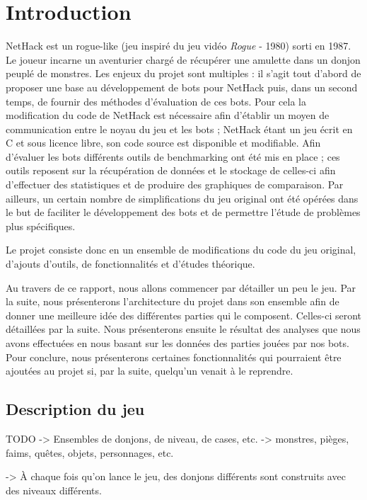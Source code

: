 \documentclass[a4paper,12pt]{article}
\begin{document}
\tableofcontents
\pagebreak

\section{Introduction}

NetHack est un rogue-like (jeu inspiré du jeu vidéo \emph{Rogue} - 1980)
sorti en 1987. Le joueur incarne un aventurier chargé de récupérer une
amulette dans un donjon peuplé de monstres.
Les enjeux du projet sont multiples : il s'agit tout d'abord de proposer une
base au développement de bots pour NetHack puis, dans un second temps, de
fournir des méthodes d'évaluation de ces bots. Pour cela la modification du code
de NetHack est nécessaire afin d'établir un moyen de communication entre le
noyau du jeu et les bots ; NetHack étant un jeu écrit en C et sous licence
libre, son code source est disponible et modifiable. Afin d'évaluer les bots
différents outils de benchmarking ont été mis en place ; ces outils reposent
sur la récupération de données et le stockage de celles-ci afin d'effectuer
des statistiques et de produire des graphiques de comparaison.
Par ailleurs, un certain nombre de simplifications du jeu original ont été
opérées dans le but de faciliter le développement des bots et de permettre
l'étude de problèmes plus spécifiques.  

Le projet consiste donc en un ensemble de modifications du code du jeu
original, d'ajouts d'outils, de fonctionnalités et d'études théorique.

Au travers de ce rapport, nous allons commencer par détailler un peu le jeu.
Par la suite, nous présenterons l'architecture du projet dans son ensemble afin
de donner une meilleure idée des différentes parties qui le composent. Celles-ci
seront détaillées par la suite. Nous présenterons ensuite le résultat des
analyses que nous avons effectuées en nous basant sur les données des parties
jouées par nos bots. Pour conclure, nous présenterons certaines fonctionnalités
qui pourraient être ajoutées au projet si, par la suite, quelqu'un venait à le
reprendre.

\subsection*{Description du jeu}
TODO
-> Ensembles de donjons, de niveau, de cases, etc.
-> monstres, pièges, faims, quêtes, objets, personnages, etc.

-> À chaque fois qu'on lance le jeu, des donjons différents sont construits
avec des niveaux différents.
\end{document}
